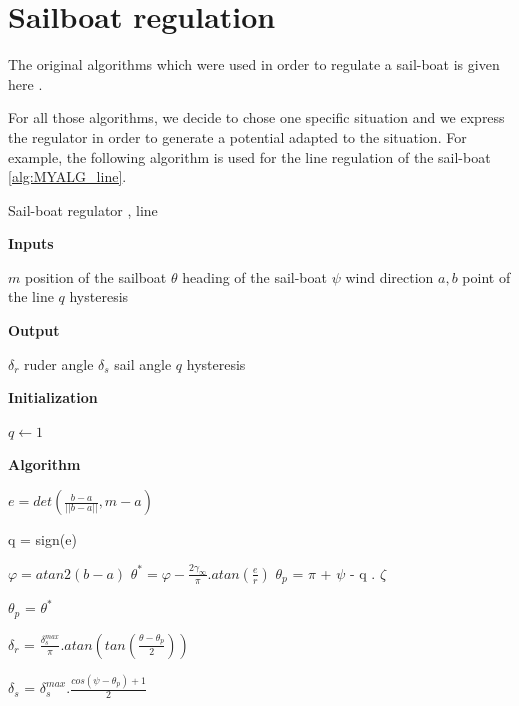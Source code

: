 \chapter{Sailboat regulation}


The original algorithms which were used in order to regulate a sail-boat is given here
\cite{jaulin2015robotique}.

For all those algorithms, we decide to chose one specific situation and we express the regulator in order to generate a potential adapted to the situation. For example, the following algorithm is used for the line regulation of the sail-boat \ref{alg:MYALG_line}.

\begin{algorithm}[H]
  \caption{Sail-boat regulator , line }
  \label{alg:MYALG_line}
  \textbf{Inputs}%
  \begin{algorithmic}[1]
    \STATE $m$ position of the sailboat
    \STATE $\theta$ heading of the sail-boat
    \STATE $\psi$ wind direction
    \STATE $a,b$ point of the line
    \STATE $q$ hysteresis
  \end{algorithmic}
  \bigskip

  \textbf{Output}%
  \begin{algorithmic}[1]
    \STATE $\delta_r$ ruder angle
    \STATE $\delta_s$ sail angle
    \STATE $q$ hysteresis
  \end{algorithmic}
  \bigskip
  
  \textbf{Initialization}%
  \begin{algorithmic}[1]
   	\STATE $q\gets 1$
  \end{algorithmic}
  
  
  \textbf{Algorithm}
  \begin{algorithmic}[1]
  	\STATE $e = det(\frac{b-a}{||b-a||},m-a)$
  	
  			\STATE q = sign(e)
  		\ENDIF
  		
  		\STATE $\varphi = atan2(b-a)$
  		\STATE $\theta^* = \varphi - \frac{2\gamma_{\infty}}{\pi} . atan(\frac{e}{r})$
     	  	\STATE $\theta_p$ = $\pi$ + $\psi$ - q . $\zeta$
     	
		\ELSE
			\STATE $\theta_p$ = $\theta^*$
	 	\ENDIF
	 	
  \STATE $\delta_r$ = $\frac{\delta_s^{max}}{\pi} . atan(tan(\frac{\theta-\theta_p}{2}))$
  
  \STATE $\delta_s$ = $\delta_s^{max} . \frac{cos(\psi-\theta_p)+1}{2}$
	
  \end{algorithmic}
\end{algorithm}

